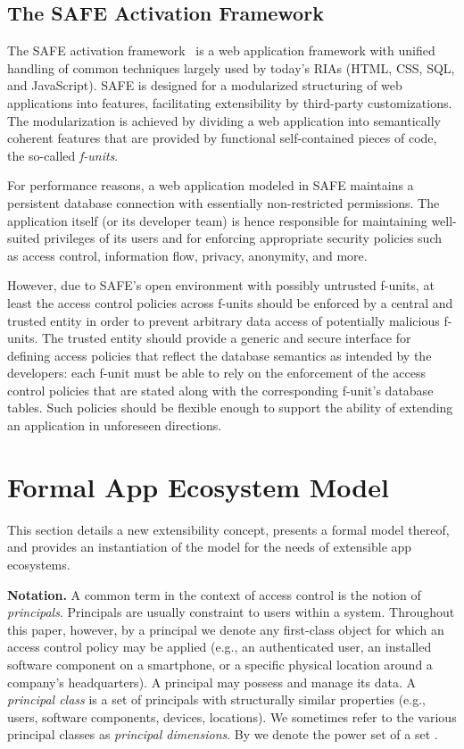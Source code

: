 \documentclass{src/acm_proc_article-sp} \else
\newcommand\myparagraph[1]{\medskip\noindent\textbf{#1.}}
\newcommand\SAFE{SAFE\xspace}
\begin{document}
\subsection{The SAFE Activation Framework}

The \SAFE activation
framework~\cite{Reischuk12:SAFE,Reischuk12:SAFEmanual} is a
web application framework with unified handling of common
techniques largely used by today's RIAs (HTML, CSS, SQL, and
JavaScript). \SAFE is designed for a modularized structuring
of web applications into features, facilitating
extensibility by third-party customizations. The
modularization is achieved by dividing a web application
into semantically coherent features that are provided by
functional self-contained pieces of code, the so-called
\emph{f-units}.





For performance reasons, a web application modeled in \SAFE
maintains a persistent database connection with essentially
non-restricted permissions. The application itself (or its
developer team) is hence responsible for maintaining
well-suited privileges of its users and for enforcing
appropriate security policies such as access control,
information flow, privacy, anonymity, and more.

However, due to \SAFE's open environment with possibly
untrusted f-units, at least the access control policies
across f-units should be enforced by a central and trusted entity in order
to prevent arbitrary data access of potentially malicious
f-units. The trusted entity should provide a generic and
secure interface for defining access policies that reflect
the database semantics as intended by the developers: each
f-unit must be able to rely on the enforcement of the access
control policies that are stated along with the
corresponding f-unit's database tables. Such policies should
be flexible enough to support the ability of extending an
application in unforeseen directions.
   \section{Formal App Ecosystem Model}
\label{sec:model}



This section details a new extensibility concept, presents a
formal model thereof, and provides an instantiation of the
model for the needs of extensible app ecosystems.

\myparagraph{Notation} A common term in the context of
access control is the notion of \emph{principals}.
Principals are usually constraint to users within a system.
Throughout this paper, however, by a principal we denote any
first-class object for which an access control policy may be
applied (e.g., an authenticated user, an installed software
component on a smartphone, or a specific physical location
around a company's headquarters). A principal may possess
and manage its data. A \emph{principal class} is a set of
principals with structurally similar properties (e.g.,
users, software components, devices, locations). We
sometimes refer to the various principal classes as
\emph{principal dimensions}. By  we denote the power
set of a set .
\end{document}
